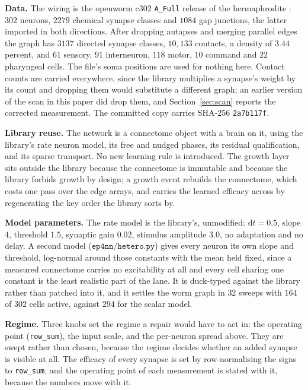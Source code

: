 \documentclass[11pt]{article}
\theoremstyle{remark}
\begin{document}
\textbf{Data.} The wiring is the openworm c302 \texttt{A\_Full} release of the hermaphrodite
\cite{openworm2014}: $302$ neurons, $2279$ chemical synapse classes and $1084$ gap junctions, the
latter imported in both directions. After dropping autapses and merging parallel edges the graph has
$3137$ directed synapse classes, $10{,}133$ contacts, a density of $3.44$ percent, and $61$ sensory,
$91$ interneuron, $118$ motor, $10$ command and $22$ pharyngeal cells. The file's soma positions are
used for nothing here. Contact counts are carried everywhere, since the library multiplies a synapse's
weight by its count and dropping them would substitute a different graph; an earlier version of the scan
in this paper did drop them, and Section~\ref{sec:scan} reports the corrected measurement. The committed
copy carries SHA-256 \texttt{2a7b117f}.

\textbf{Library reuse.} The network is a connectome object with a brain on it, using the library's
rate neuron model, its free and nudged phases, its residual qualification, and its sparse transport.
No new learning rule is introduced. The growth layer sits outside the library because the
connectome is immutable and because the library forbids growth by design; a growth event rebuilds
the connectome, which costs one pass over the edge arrays, and carries the learned efficacy across by
regenerating the key order the library sorts by.

\textbf{Model parameters.} The rate model is the library's, unmodified: $\mathrm{d}t = 0.5$, slope $4$,
threshold $1.5$, synaptic gain $0.02$, stimulus amplitude $3.0$, no adaptation and no delay. A second
model ($\texttt{ep4nn/hetero.py}$) gives every neuron its own slope and threshold, log-normal around
those constants with the mean held fixed, since a measured connectome carries no excitability at all
and every cell sharing one constant is the least realistic part of the lane. It is duck-typed against
the library rather than patched into it, and it settles the worm graph in $32$ sweeps with $164$ of
$302$ cells active, against $294$ for the scalar model.

\textbf{Regime.} Three knobs set the regime a repair would have to act in: the operating point
(\texttt{row\_sum}), the input scale, and the per-neuron spread above. They are swept rather than
chosen, because the regime decides whether an added synapse is visible at all. The efficacy
of every synapse is set by row-normalising the signs to \texttt{row\_sum}, and the operating point of
each measurement is stated with it, because the numbers move with it.
\end{document}
